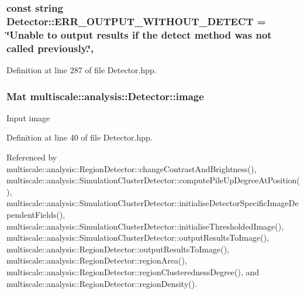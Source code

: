 \hypertarget{classmultiscale_1_1analysis_1_1Detector_a5837f0e4ffef6410774ff9bcda72238b}{
\subsubsection[{E\-R\-R\-\_\-\-O\-U\-T\-P\-U\-T\-\_\-\-W\-I\-T\-H\-O\-U\-T\-\_\-\-D\-E\-T\-E\-C\-T}]{\setlength{\rightskip}{0pt plus 5cm}const string Detector\-::\-E\-R\-R\-\_\-\-O\-U\-T\-P\-U\-T\-\_\-\-W\-I\-T\-H\-O\-U\-T\-\_\-\-D\-E\-T\-E\-C\-T = \char`\"{}Unable to output results if the {\bf detect} method was not called previously.\char`\"{}\hspace{0.3cm}{\ttfamily [static]}, {\ttfamily [protected]}}}\label{classmultiscale_1_1analysis_1_1Detector_a5837f0e4ffef6410774ff9bcda72238b}


Definition at line 287 of file Detector.\-hpp.

\hypertarget{classmultiscale_1_1analysis_1_1Detector_a523830a6cfe409694ce8327c3c736fbd}{
\subsubsection[{image}]{\setlength{\rightskip}{0pt plus 5cm}Mat multiscale\-::analysis\-::\-Detector\-::image\hspace{0.3cm}{\ttfamily [protected]}}}\label{classmultiscale_1_1analysis_1_1Detector_a523830a6cfe409694ce8327c3c736fbd}
Input image 

Definition at line 40 of file Detector.\-hpp.



Referenced by multiscale\-::analysis\-::\-Region\-Detector\-::change\-Contrast\-And\-Brightness(), multiscale\-::analysis\-::\-Simulation\-Cluster\-Detector\-::compute\-Pile\-Up\-Degree\-At\-Position(), multiscale\-::analysis\-::\-Simulation\-Cluster\-Detector\-::initialise\-Detector\-Specific\-Image\-Dependent\-Fields(), multiscale\-::analysis\-::\-Simulation\-Cluster\-Detector\-::initialise\-Thresholded\-Image(), multiscale\-::analysis\-::\-Simulation\-Cluster\-Detector\-::output\-Results\-To\-Image(), multiscale\-::analysis\-::\-Region\-Detector\-::output\-Results\-To\-Image(), multiscale\-::analysis\-::\-Region\-Detector\-::region\-Area(), multiscale\-::analysis\-::\-Region\-Detector\-::region\-Clusteredness\-Degree(), and multiscale\-::analysis\-::\-Region\-Detector\-::region\-Density().

